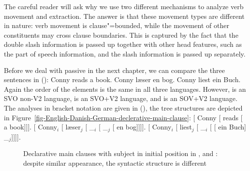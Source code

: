 The careful reader will ask why we use two different mechanisms to analyze verb movement and
extraction. The answer is that these movement types are different in nature: verb movement is
clause"=bounded, while the movement of other constituents may cross clause boundaries. This is captured by the
fact that the double slash information is passed up together with other head features, such as the
part of speech information, and the slash information is passed up separately. 

\largerpage
Before we deal with passive in the next chapter, we can compare the three sentences in ():
\eal
\ex Conny reads a book.
\ex Conny læser en bog.
\ex Conny liest ein Buch.
\zl
Again the order of the elements is the same in all three languages. However,  is an SVO
non-V2 language,  is an SVO+V2 language, and  is an SOV+V2 language. The analyses in
bracket notation are given in (), the tree structures are depicted in Figure~\vref{fig-English-Danish-German-declerative-main-clause}:
\eal
\ex {}[ Conny [ reads [ a book]]].
\ex {}[ Conny$_i$ [ læser$_j$ [ \_$_i$ [  \_$_j$ [ en bog]]]].
\ex {}[ Conny$_i$ [ liest$_j$ [ \_$_i$ [\sub{\vbar} [ ein Buch] \_$_j$]]]].
\zl
\begin{figure}
\hfill
{}
\hfill
{}
\caption{\label{fig-English-Danish-German-declerative-main-clause}Declarative main clauses with
  subject in initial position in ,  and : despite similar appearance, the
  syntactic structure is different}
\end{figure}

